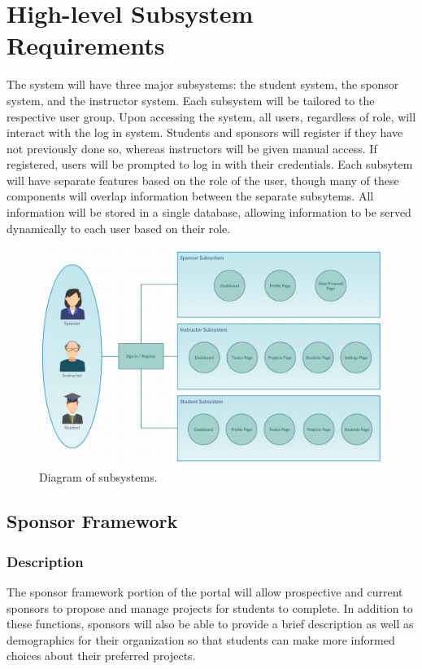 \documentclass[12pt]{article}
\begin{document}
\section{High-level Subsystem Requirements}
The system will have three major subsystems: the student system, the sponsor system, and the instructor system. Each subsystem will be tailored to the respective user group. Upon accessing the system, all users, regardless of role, will interact with the log in system. Students and sponsors will register if they have not previously done so, whereas instructors will be given manual access. If registered, users will be prompted to log in with their credentials. Each subsytem will have separate features based on the role of the user, though many of these components will overlap information between the separate subsytems. All information will be stored in a single database, allowing information to be served dynamically to each user based on their role.
\begin{figure}[!htb]
	\includegraphics[width=\linewidth]{subsystems.png}
	\caption{Diagram of subsystems.}
	\label{fig:subsystems}
\end{figure}

\FloatBarrier
\subsection{Sponsor Framework}

\subsubsection{Description}

The sponsor framework portion of the portal will allow prospective and current sponsors to propose and manage projects for students to complete. In addition to these functions, sponsors will also be able to provide a brief description as well as demographics for their organization so that students can make more informed choices about their preferred projects.
\end{document}
